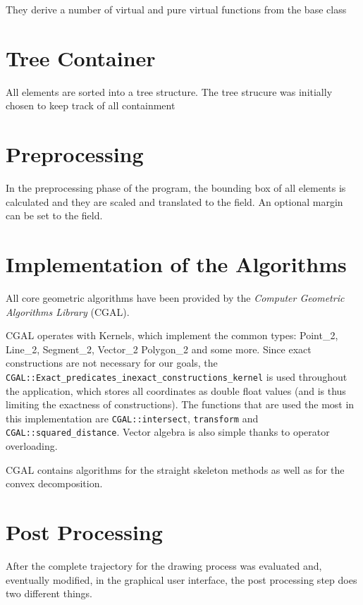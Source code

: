 They derive a number of virtual and pure virtual functions from the base class

	\section{Tree Container}

All elements are sorted into a tree structure. The tree strucure was initially chosen to keep track of all containment 

\section{Preprocessing}

In the preprocessing phase of the program, the bounding box of all elements is calculated and they are scaled and translated to the field. An optional margin can be set to the field.

\section{Implementation of the Algorithms}

All core geometric algorithms have been provided by the \textit{Computer Geometric Algorithms Library}\cite{cgal:eb-00a} (CGAL).

CGAL operates with Kernels, which implement the common types: Point\_2, Line\_2, Segment\_2, Vector\_2 Polygon\_2 and some more. Since exact constructions are not necessary for our goals, the \texttt{CGAL::Exact\_predicates\_inexact\_constructions\_kernel} is used throughout the application, which stores all coordinates as double float values (and is thus limiting the exactness of constructions). The functions that are used the most in this implementation are \texttt{CGAL::intersect}, \texttt{transform} and \texttt{CGAL::squared\_distance}. Vector algebra is also simple thanks to operator overloading.

CGAL contains algorithms for the straight skeleton methods\cite{cgal:c-sspo2-14a} as well as for the convex decomposition\cite{cgal:h-pp2-00a}.

\section{Post Processing}

After the complete trajectory for the drawing process was evaluated and, eventually modified, in the graphical user interface, the post processing step does two different things.

